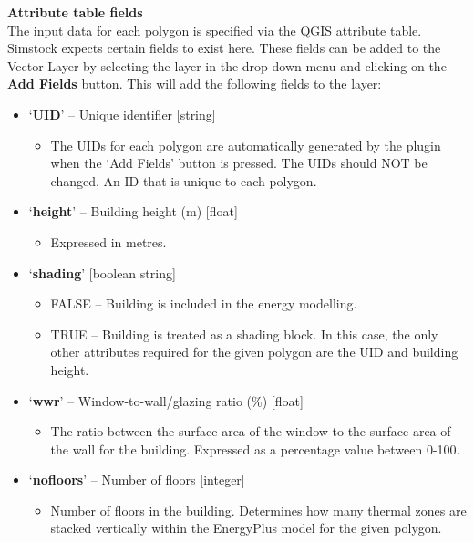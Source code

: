 \documentclass{article}
\begin{document}
\textbf{Attribute table fields} \\
The input data for each polygon is specified via the QGIS attribute table. Simstock expects certain fields to exist here. These fields can be added to the Vector Layer by selecting the layer in the drop-down menu and clicking on the \textbf{Add Fields} button. This will add the following fields to the layer: %
\begin{itemize}
    \item `\textbf{UID}' -- {Unique identifier} [string]
    \begin{itemize}
        \item The UIDs for each polygon are automatically generated by the plugin when the `Add Fields' button is pressed. The UIDs should NOT be changed. An ID that is unique to each polygon.%
    \end{itemize}
    \item `\textbf{height}' -- {Building height (m)} [float]
    \begin{itemize}
        \item Expressed in metres.
    \end{itemize}
    \item `\textbf{shading}' [boolean string]
    \begin{itemize}
        \item FALSE -- Building is included in the energy modelling.
        \item TRUE -- Building is treated as a shading block. In this case, the only other attributes required for the given polygon are the UID and building height.
    \end{itemize}
    \item `\textbf{wwr}' -- {Window-to-wall/glazing ratio} (\%) [float]
    \begin{itemize}
        \item The ratio between the surface area of the window to the surface area of the wall for the building. Expressed as a percentage value between 0-100.
    \end{itemize}
    \item `\textbf{nofloors}' -- {Number of floors} [integer]
    \begin{itemize}
        \item Number of floors in the building. Determines how many thermal zones are stacked vertically within the EnergyPlus model for the given polygon.

\end{itemize}
\end{itemize}
\end{document}
